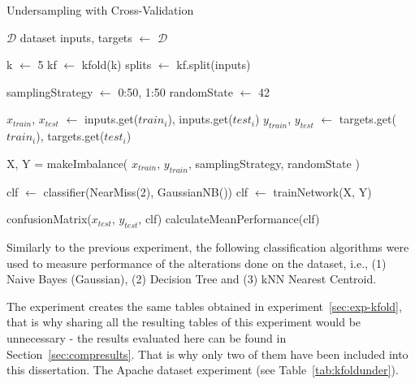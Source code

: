 \begin{breakablealgorithm}
    \caption{Undersampling with Cross-Validation}
    \label{alg:kfoldunder}
    \begin{algorithmic}[1]
        \Require $\mathcal{D}$ dataset
        \State inputs, targets $\leftarrow$ $\mathcal{D}$
    
        \State k $\leftarrow$ 5
        \State kf $\leftarrow$ kfold(k)
        \State splits $\leftarrow$ kf.split(inputs)
        
        \State samplingStrategy $\leftarrow$ {0:50, 1:50} 
        \State randomState $\leftarrow$ 42
        
        	\State $x_{train}$, $x_{test}$ $\leftarrow$ inputs.get($train_{i}$), inputs.get($test_{i}$)
        	\State $y_{train}$, $y_{test}$ $\leftarrow$ targets.get($train_{i}$), targets.get($test_{i}$)
        	
        	\State X, Y = makeImbalance(
        	\State \quad $x_{train}$, $y_{train}$,
        	\State \quad samplingStrategy,
        	\State \quad randomState
        	\State )
        	
        	\State clf $\leftarrow$ classifier(NearMiss(2), GaussianNB())
        	\State clf $\leftarrow$ trainNetwork(X, Y)
        	
        	\State confusionMatrix($x_{test}$, $y_{test}$, clf)
        \EndFor
        \State calculateMeanPerformance(clf)
    \end{algorithmic}
\end{breakablealgorithm}

Similarly to the previous experiment, the following classification algorithms 
were used to measure performance of the alterations done on the dataset, i.e., 
(1) Naive Bayes (Gaussian), (2) Decision Tree and (3) kNN Nearest Centroid.

The experiment creates the same tables obtained in 
experiment~\ref{sec:exp-kfold}, that is why sharing all the resulting tables of 
this experiment would be unnecessary - the results evaluated here can be found 
in Section~\ref{sec:compresults}. That is why only two of them have been 
included into this dissertation. The Apache dataset experiment (see 
Table~\ref{tab:kfoldunder}).

